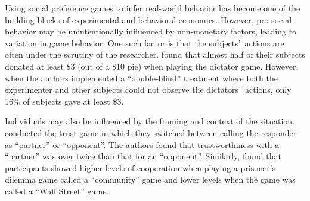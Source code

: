 \documentclass[12pt]{article}
\begin{document}

Using social preference games to infer real-world behavior has become one of the building blocks of experimental and behavioral economics. However, pro-social behavior may be unintentionally influenced by non-monetary factors, leading to variation in game behavior. One such factor is that the subjects\rq \ actions are often under the scrutiny of the researcher. \cite{hoffman_1994} found that almost half of their subjects donated at least \$3 (out of a \$10 pie) when playing the dictator game. However, when the authors implemented a ``double-blind'' treatment where both the experimenter and other subjects could not observe the dictators\rq \ actions, only 16\% of subjects gave at least \$3.

Individuals may also be influenced by the framing and context of the situation. \cite{burnham_mccabe_smith_2000} conducted the trust game in which they switched between calling the responder as ``partner'' or ``opponent''. The authors found that trustworthiness with a ``partner'' was over twice than that for an ``opponent''. Similarly, \cite{ross_ward_1996} found that participants showed higher levels of cooperation when playing a prisoner\rq s dilemma game called a ``community'' game and lower levels when the game was called a ``Wall Street'' game. 

\end{document}
